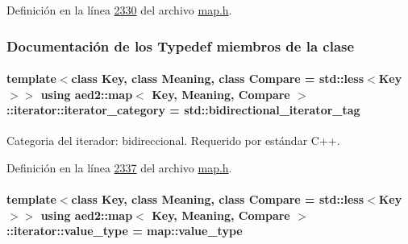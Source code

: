 Definición en la línea \hyperlink{map_8h_source_l02330}{2330} del archivo \hyperlink{map_8h_source}{map.\+h}.



\subsubsection{Documentación de los \textquotesingle{}Typedef\textquotesingle{} miembros de la clase}
\paragraph[{\texorpdfstring{iterator\+\_\+category}{iterator_category}}]{\setlength{\rightskip}{0pt plus 5cm}template$<$class Key, class Meaning, class Compare = std\+::less$<$\+Key$>$$>$ using {\bf aed2\+::map}$<$ Key, Meaning, Compare $>$\+::{\bf iterator\+::iterator\+\_\+category} =  std\+::bidirectional\+\_\+iterator\+\_\+tag}\hypertarget{classaed2_1_1map_1_1iterator_a709df3d8aef6fd1eeb839616b554ff0b_a709df3d8aef6fd1eeb839616b554ff0b}{}\label{classaed2_1_1map_1_1iterator_a709df3d8aef6fd1eeb839616b554ff0b_a709df3d8aef6fd1eeb839616b554ff0b}


Categoria del iterador\+: bidireccional. Requerido por estándar C++. 



Definición en la línea \hyperlink{map_8h_source_l02337}{2337} del archivo \hyperlink{map_8h_source}{map.\+h}.

\paragraph[{\texorpdfstring{value\+\_\+type}{value_type}}]{\setlength{\rightskip}{0pt plus 5cm}template$<$class Key, class Meaning, class Compare = std\+::less$<$\+Key$>$$>$ using {\bf aed2\+::map}$<$ Key, Meaning, Compare $>$\+::{\bf iterator\+::value\+\_\+type} =  {\bf map\+::value\+\_\+type}}\hypertarget{classaed2_1_1map_1_1iterator_a4e1d954ef5c6a64bbcd881854f039a16_a4e1d954ef5c6a64bbcd881854f039a16}{}\label{classaed2_1_1map_1_1iterator_a4e1d954ef5c6a64bbcd881854f039a16_a4e1d954ef5c6a64bbcd881854f039a16}


